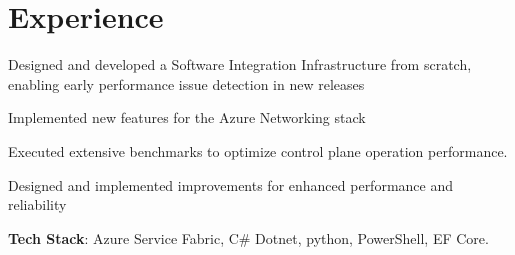 \documentclass[letterpaper]{deedy-resume} %
\begin{document}
\begin{minipage}[t]{0.66\textwidth} %


\section{Experience}


\vspace{\topsep} %
\begin{tightitemize}
\item Designed and developed a Software Integration Infrastructure from scratch, enabling early performance issue detection in new releases
\item Implemented new features for the Azure Networking stack
\item Executed extensive benchmarks to optimize control plane operation performance.
\item Designed and implemented improvements for enhanced performance and reliability
\item \textbf{Tech Stack}: Azure Service Fabric, C\# Dotnet, python, PowerShell, EF Core.
\end{tightitemize}




\end{minipage}
\end{document}
